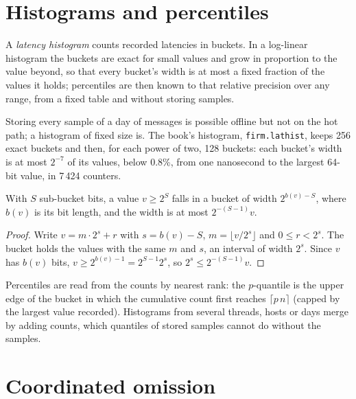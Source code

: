 \section{Histograms and percentiles}

\begin{definition}\label{def:ll:measuring-latency:hist}
A \emph{latency histogram} counts recorded latencies in buckets. In a log-linear histogram the
buckets are exact for small values and grow in proportion to the value beyond, so that every bucket's width is at most a
fixed fraction of the values it holds; percentiles are then known to that relative precision over any range, from a
fixed table and without storing samples.
\end{definition}

Storing every sample of a day of messages is possible offline but not on the hot path; a histogram of fixed size is.
The book's histogram, \texttt{firm.lathist}, keeps 256 exact buckets and then, for each power of two, 128 buckets: each
bucket's width is at most $2^{-7}$ of its values, below 0.8\%, from one nanosecond to the largest 64-bit value, in 7\,424
counters.

\begin{proposition}\label{prop:ll:measuring-latency:precision}
With $S$ sub-bucket bits, a value $v \ge 2^S$ falls in a bucket of width $2^{b(v)-S}$, where $b(v)$ is its bit length, and
the width is at most $2^{-(S-1)}v$.
\end{proposition}

\begin{proof}
Write $v = m \cdot 2^{s} + r$ with $s = b(v) - S$, $m = \lfloor v/2^s \rfloor$ and $0 \le r < 2^s$. The bucket holds the
values with the same $m$ and $s$, an interval of width $2^s$. Since $v$ has $b(v)$ bits, $v \ge 2^{b(v)-1} = 2^{S-1}2^s$,
so $2^s \le 2^{-(S-1)}v$.
\end{proof}

Percentiles are read from the counts by nearest rank: the $p$-quantile is the upper edge of the bucket in which the
cumulative count first reaches $\lceil p\,n \rceil$ (capped by the largest value recorded). Histograms from several
threads, hosts or days merge by adding counts, which quantiles of stored samples cannot do without the samples.

\section{Coordinated omission}

